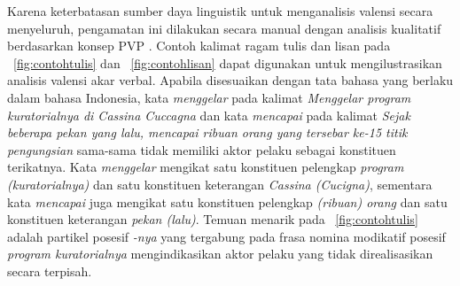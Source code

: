 Karena keterbatasan sumber daya linguistik untuk menganalisis valensi secara menyeluruh, pengamatan ini dilakukan secara manual dengan analisis kualitatif berdasarkan konsep PVP \citep{liu2006syntactic}. Contoh kalimat ragam tulis dan lisan pada \pic~\ref{fig:contohtulis} dan \pic~\ref{fig:contohlisan} dapat digunakan untuk mengilustrasikan analisis valensi akar verbal. Apabila disesuaikan dengan tata bahasa yang berlaku dalam bahasa Indonesia, kata \textit{menggelar} pada kalimat \textit{Menggelar program kuratorialnya di Cassina Cuccagna} dan kata \textit{mencapai} pada kalimat \textit{Sejak beberapa pekan yang lalu, mencapai ribuan orang yang tersebar ke-15 titik pengungsian} sama-sama tidak memiliki aktor pelaku sebagai konstituen terikatnya. Kata \textit{menggelar} mengikat satu konstituen pelengkap \textit{program (kuratorialnya)} dan satu konstituen keterangan \textit{Cassina (Cucigna)}, sementara kata \textit{mencapai} juga mengikat satu konstituen pelengkap \textit{(ribuan) orang} dan satu konstituen keterangan \textit{pekan (lalu)}. Temuan menarik pada \pic~\ref{fig:contohtulis} adalah partikel posesif \textit{-nya} yang tergabung pada frasa nomina modikatif posesif \textit{program kuratorialnya} mengindikasikan aktor pelaku yang tidak direalisasikan secara terpisah. 
